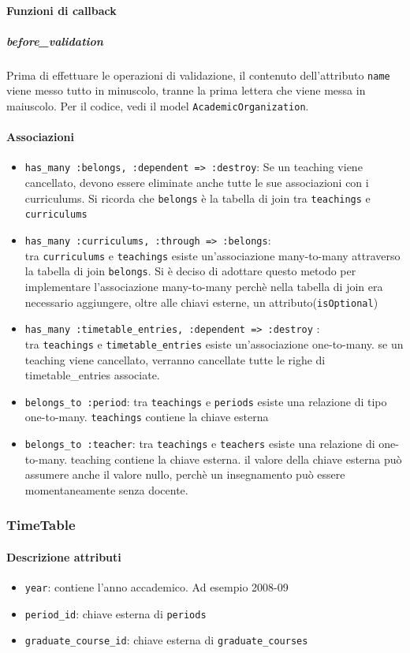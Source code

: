 \documentclass[11pt,a4paper]{article}
\begin{document}
\paragraph{Funzioni di callback}
\subparagraph{before\_validation}
Prima di effettuare le operazioni di validazione, il contenuto dell'attributo \verb|name| viene messo tutto in minuscolo, tranne la prima lettera che viene messa in maiuscolo. Per il codice, vedi il model \verb|AcademicOrganization|.

\paragraph{Associazioni}
\begin{itemize}
 \item \verb|has_many :belongs, :dependent => :destroy|: Se un teaching viene cancellato, devono essere eliminate anche tutte le sue associazioni con i curriculums. Si ricorda che \verb|belongs| è la tabella di join tra \verb|teachings| e \verb|curriculums|
\item \verb|has_many :curriculums, :through => :belongs|:\\ tra \verb|curriculums| e \verb|teachings| esiste un'associazione many-to-many attraverso la tabella di join \verb|belongs|. Si è deciso di adottare questo metodo per implementare l'associazione many-to-many perchè nella tabella di join era necessario aggiungere, oltre alle chiavi esterne, un attributo(\verb|isOptional|) 		
\item \verb|has_many :timetable_entries, :dependent => :destroy| :\\tra \verb|teachings| e \verb|timetable_entries| esiste un'associazione one-to-many. se un teaching viene cancellato, verranno cancellate tutte le righe di timetable\_entries associate.
\item \verb|belongs_to :period|: tra \verb|teachings| e \verb|periods| esiste una relazione di tipo one-to-many. \verb|teachings| contiene la chiave esterna
\item \verb|belongs_to :teacher|: tra \verb|teachings| e \verb|teachers| esiste una relazione di one-to-many. teaching contiene la chiave esterna. il valore della chiave esterna può assumere anche il valore nullo, perchè un insegnamento può essere momentaneamente senza docente.
\end{itemize}
\subsubsection{TimeTable}
\paragraph{Descrizione attributi}
 \begin{itemize}
  \item \verb|year|: contiene l'anno accademico. Ad esempio 2008-09
  \item \verb|period_id|: chiave esterna di \verb|periods|
  \item \verb|graduate_course_id|: chiave esterna di \verb|graduate_courses|
 \end{itemize}
\end{document}

